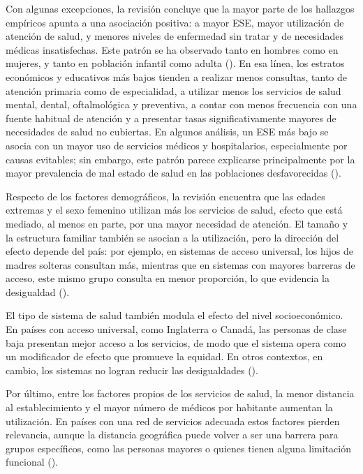\documentclass[
  spanish,
  a4paper,
  oneside]{scrbook}
\begin{document}
Con algunas excepciones, la revisión concluye que la mayor parte de los
hallazgos empíricos apunta a una asociación positiva: a mayor ESE, mayor
utilización de atención de salud, y menores niveles de enfermedad sin
tratar y de necesidades médicas insatisfechas. Este patrón se ha
observado tanto en hombres como en mujeres, y tanto en población
infantil como adulta (). En esa línea, los estratos económicos y educativos más bajos
tienden a realizar menos consultas, tanto de atención primaria como de
especialidad, a utilizar menos los servicios de salud mental, dental,
oftalmológica y preventiva, a contar con menos frecuencia con una fuente
habitual de atención y a presentar tasas significativamente mayores de
necesidades de salud no cubiertas. En algunos análisis, un ESE más bajo
se asocia con un mayor uso de servicios médicos y hospitalarios,
especialmente por causas evitables; sin embargo, este patrón parece
explicarse principalmente por la mayor prevalencia de mal estado de
salud en las poblaciones desfavorecidas
().

Respecto de los factores demográficos, la revisión encuentra que las
edades extremas y el sexo femenino utilizan más los servicios de salud,
efecto que está mediado, al menos en parte, por una mayor necesidad de
atención. El tamaño y la estructura familiar también se asocian a la
utilización, pero la dirección del efecto depende del país: por ejemplo,
en sistemas de acceso universal, los hijos de madres solteras consultan
más, mientras que en sistemas con mayores barreras de acceso, este mismo
grupo consulta en menor proporción, lo que evidencia la desigualdad
().

El tipo de sistema de salud también modula el efecto del nivel
socioeconómico. En países con acceso universal, como Inglaterra o
Canadá, las personas de clase baja presentan mejor acceso a los
servicios, de modo que el sistema opera como un modificador de efecto
que promueve la equidad. En otros contextos, en cambio, los sistemas no
logran reducir las desigualdades
().

Por último, entre los factores propios de los servicios de salud, la
menor distancia al establecimiento y el mayor número de médicos por
habitante aumentan la utilización. En países con una red de servicios
adecuada estos factores pierden relevancia, aunque la distancia
geográfica puede volver a ser una barrera para grupos específicos, como
las personas mayores o quienes tienen alguna limitación funcional
().
\end{document}
